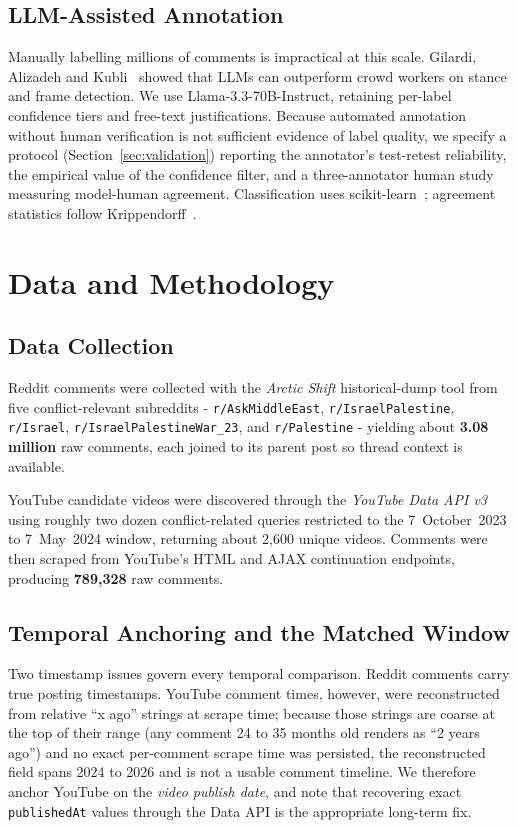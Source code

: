\documentclass[pdflatex,sn-basic,Numbered,iicol]{sn-jnl}
\begin{document}
\subsection{LLM-Assisted Annotation}
Manually labelling millions of comments is impractical at this scale. Gilardi,
Alizadeh and Kubli~\cite{gilardi2023} showed that LLMs can outperform crowd workers
on stance and frame detection. We use Llama-3.3-70B-Instruct, retaining per-label
confidence tiers and free-text justifications. Because automated annotation without
human verification is not sufficient evidence of label quality, we specify a
protocol (Section~\ref{sec:validation}) reporting the annotator's test-retest reliability, the empirical value of the confidence filter, and a three-annotator human study measuring
model-human agreement.
Classification uses scikit-learn~\cite{pedregosa2011}; agreement statistics follow
Krippendorff~\cite{hayes2007}.

\section{Data and Methodology}
\label{sec:data}
\subsection{Data Collection}
Reddit comments were collected with the \textit{Arctic Shift} historical-dump tool
from five conflict-relevant subreddits - \texttt{r/AskMiddleEast},
\texttt{r/IsraelPalestine}, \texttt{r/Israel}, \texttt{r/IsraelPalestineWar\_23},
and \texttt{r/Palestine} - yielding about \textbf{3.08 million} raw comments, each
joined to its parent post so thread context is available.

YouTube candidate videos were discovered through the \textit{YouTube Data API v3}
using roughly two dozen conflict-related queries restricted to the
7~October~2023 to 7~May~2024 window, returning about 2{,}600 unique videos. Comments
were then scraped from YouTube's HTML and AJAX continuation endpoints, producing
\textbf{789{,}328} raw comments.

\subsection{Temporal Anchoring and the Matched Window}
Two timestamp issues govern every temporal comparison. Reddit comments carry true
posting timestamps. YouTube comment times, however, were reconstructed from relative
``x ago'' strings at scrape time; because those strings are coarse at the top of
their range (any comment 24 to 35 months old renders as ``2 years ago'') and no exact
per-comment scrape time was persisted, the reconstructed field spans 2024 to 2026 and
is not a usable comment timeline. We therefore anchor YouTube on the \emph{video
publish date}, and note that recovering exact \texttt{publishedAt} values through the
Data API is the appropriate long-term fix.
\end{document}
